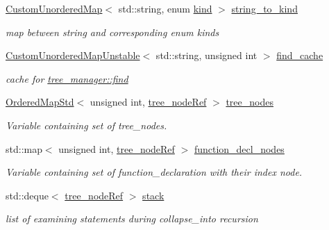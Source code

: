 \begin{DoxyCompactItemize}
\item 
\hyperlink{custom__map_8hpp_ad1ed68f2ff093683ab1a33522b144adc}{Custom\+Unordered\+Map}$<$ std\+::string, enum \hyperlink{tree__common_8hpp_a9efbd7c7191fb190b76c2fd05d6e7b45}{kind} $>$ \hyperlink{classtree__manager_a256acc0499d0b773e6a074e35c5a9987}{string\+\_\+to\+\_\+kind}
\begin{DoxyCompactList}\small\item\em map between string and corresponding enum kinds \end{DoxyCompactList}\item 
\hyperlink{custom__map_8hpp_a8cbaceffc09790a885ec7e9c17809c69}{Custom\+Unordered\+Map\+Unstable}$<$ std\+::string, unsigned int $>$ \hyperlink{classtree__manager_adf640d56670e9252b7bf03930d953d7c}{find\+\_\+cache}
\begin{DoxyCompactList}\small\item\em cache for \hyperlink{classtree__manager_aeb1203c36b76b27e3b322d4a8cfc55d8}{tree\+\_\+manager\+::find} \end{DoxyCompactList}\item 
\hyperlink{custom__map_8hpp_a1609f0ce858c41bf505bdff46f230a87}{Ordered\+Map\+Std}$<$ unsigned int, \hyperlink{tree__node_8hpp_a6ee377554d1c4871ad66a337eaa67fd5}{tree\+\_\+node\+Ref} $>$ \hyperlink{classtree__manager_a649bd69a0ce6482ae28be79a906fa191}{tree\+\_\+nodes}
\begin{DoxyCompactList}\small\item\em Variable containing set of tree\+\_\+nodes. \end{DoxyCompactList}\item 
std\+::map$<$ unsigned int, \hyperlink{tree__node_8hpp_a6ee377554d1c4871ad66a337eaa67fd5}{tree\+\_\+node\+Ref} $>$ \hyperlink{classtree__manager_af8a44833d20aa181fefc0f681f08cc16}{function\+\_\+decl\+\_\+nodes}
\begin{DoxyCompactList}\small\item\em Variable containing set of function\+\_\+declaration with their index node. \end{DoxyCompactList}\item 
std\+::deque$<$ \hyperlink{tree__node_8hpp_a6ee377554d1c4871ad66a337eaa67fd5}{tree\+\_\+node\+Ref} $>$ \hyperlink{classtree__manager_a646fa07ed16636dfd498f6d2043eb63d}{stack}
\begin{DoxyCompactList}\small\item\em list of examining statements during collapse\+\_\+into recursion \end{DoxyCompactList}\item 

\end{DoxyCompactItemize}
